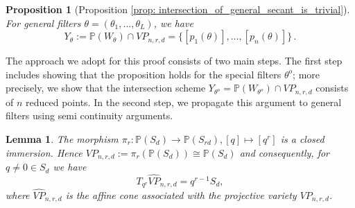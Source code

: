 \documentclass[final]{article}
\newcommand{\PP}{\mathbb{P}}
\theoremstyle{definition}
\theoremstyle{plain}
\newtheorem{lemma}[definition]{Lemma}
\newtheorem{proposition}[definition]{Proposition}
\begin{document}
\begin{proposition}[Proposition \ref{prop: intersection_of_general_secant_is_trivial}]
    For general filters $\theta = (\theta_1, \dots, \theta_L)$, we have
    \[Y_\theta := \mathbb{P}(W_{\theta}) \cap VP_{n, r, d} = \{[p_1(\theta)], \dots, [p_n(\theta)]\} \, .\]
\end{proposition}

The approach we adopt for this proof consists of two main steps. The first step includes showing that the proposition holds for the special filters $\theta^o$; more precisely, we show that the intersection scheme $Y_{\theta^o} = \mathbb{P}(W_{\theta^o}) \cap VP_{n, r, d}$ consists of $n$ reduced points.
In the second step, we propagate this argument to general filters using semi continuity arguments.


\begin{lemma}\label{lemma: pi_r_is_a_closed_immersion}
    The morphism $\pi_r: \PP(S_d) \to \PP(S_{rd}), [q]\mapsto [q^r]$ is a closed immersion.
    Hence $VP_{n, r, d} := \pi_{r}(\PP(S_d)) \cong \PP(S_{d})$ and consequently, for $q \neq 0 \in S_d$ we have 
    \[
    T_{q^r} \widehat{VP}_{n,r,d} = q^{r-1}S_d,
    \]
    where $\widehat{VP}_{n, r, d}$ is the affine cone associated with the projective variety $VP_{n, r, d}$.
\end{lemma}
\end{document}
